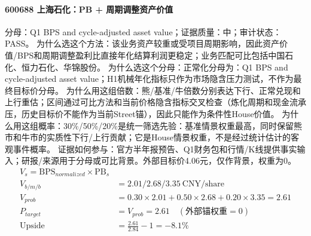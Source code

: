 \paragraph{600688 上海石化：PB + 周期调整资产价值}
分母：Q1 BPS and cycle-adjusted asset value；证据质量：中；审计状态：PASS。
为什么选这个方法：该业务资产较重或受项目周期影响，因此资产价值/BPS和周期调整盈利比直接年化结算利润更稳定；业务匹配可比包括中国石化、恒力石化、华锦股份。
为什么选这个分母：正常化分母为：Q1 BPS and cycle-adjusted asset value；H1机械年化指标只作为市场隐含压力测试，不作为最终目标价分母。
为什么用这组倍数：熊/基准/牛倍数分别表达下行、正常兑现和上行重估；区间通过可比方法和当前价格隐含指标交叉检查（炼化周期和现金流承压，历史目标价不能作为当前Street锚），因此只能作为条件性House价值。
为什么用这组概率：30\%/50\%/20\%是统一筛选先验：基准情景权重最高，同时保留熊市和牛市的实质性下行/上行贡献；它是House情景权重，不是经过统计估计的客观事件概率。
证据如何参与：官方半年报预告、Q1财务包和行情/K线提供事实输入；研报/来源用于分母或可比背景。外部目标价4.06元，仅作背景，权重为0。
\begin{align*}
V_s=\mathrm{BPS}_{normalized}\times \mathrm{PB}_s\\
V_{b/m/b} &= 2.01/2.68/3.35\ \mathrm{CNY/share}\\
V_{prob} &= 0.30\times 2.01+0.50\times 2.68+0.20\times 3.35=2.61\\
P_{target} &= V_{prob}=2.61\quad(\text{外部锚权重}=0)\\
\mathrm{Upside} &= \frac{2.61}{2.84}-1=-8.1\%\\
\end{align*}

